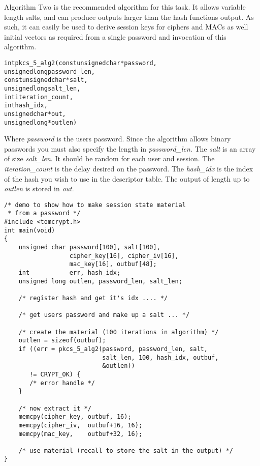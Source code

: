 \documentclass[synpaper]{book}
\begin{document}
Algorithm Two is the recommended algorithm for this task.  It allows variable length salts, and can produce outputs larger than the
hash functions output.  As such, it can easily be used to derive session keys for ciphers and MACs as well initial vectors as required
from a single password and invocation of this algorithm.

\begin{alltt}
int pkcs_5_alg2(const unsigned char *password,
                      unsigned long  password_len,
                const unsigned char *salt,
                      unsigned long  salt_len,
                                int  iteration_count,
                                int  hash_idx,
                      unsigned char *out,
                      unsigned long *outlen)
\end{alltt}
Where \textit{password} is the users password.  Since the algorithm allows binary passwords you must also specify the length in \textit{password\_len}.
The \textit{salt} is an array of size \textit{salt\_len}.  It should be random for each user and session.  The \textit{iteration\_count} is the delay desired
on the password.  The \textit{hash\_idx} is the index of the hash you wish to use in the descriptor table.   The output of length up to
\textit{outlen} is stored in \textit{out}.

\begin{verbatim}
/* demo to show how to make session state material
 * from a password */
#include <tomcrypt.h>
int main(void)
{
    unsigned char password[100], salt[100],
                  cipher_key[16], cipher_iv[16],
                  mac_key[16], outbuf[48];
    int           err, hash_idx;
    unsigned long outlen, password_len, salt_len;

    /* register hash and get it's idx .... */

    /* get users password and make up a salt ... */

    /* create the material (100 iterations in algorithm) */
    outlen = sizeof(outbuf);
    if ((err = pkcs_5_alg2(password, password_len, salt,
                           salt_len, 100, hash_idx, outbuf,
                           &outlen))
       != CRYPT_OK) {
       /* error handle */
    }

    /* now extract it */
    memcpy(cipher_key, outbuf, 16);
    memcpy(cipher_iv,  outbuf+16, 16);
    memcpy(mac_key,    outbuf+32, 16);

    /* use material (recall to store the salt in the output) */
}
\end{verbatim}
\end{document}
